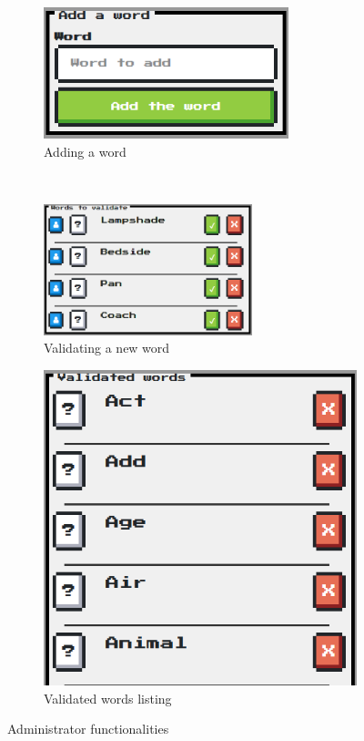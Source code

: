 \documentclass{tnreport}
\begin{document}
\begin{figure}[ht]
	\centering
	\begin{subfigure}[t]{0.5\textwidth}
		\centering
		\includegraphics[height=1.5in]{figures/admin_add_word}
		\caption{Adding a word}
		\label{fig:admin_add_word}
	\end{subfigure}%
	~ 
	\begin{subfigure}[t]{0.5\textwidth}
		\centering
		\includegraphics[height=1.5in]{figures/admin_validate_word}
		\caption{Validating a new word}
		\label{fig:admin_validate_word}
	\end{subfigure}
	\begin{subfigure}[t]{0.5\textwidth}
		\centering
		\vspace*{1cm}
		\includegraphics[scale=0.6]{figures/admin_validated_words}
		\caption{Validated words listing}
		\label{fig:admin_validated_words}
	\end{subfigure}
	\caption{Administrator functionalities}
\end{figure} 
\end{document}
